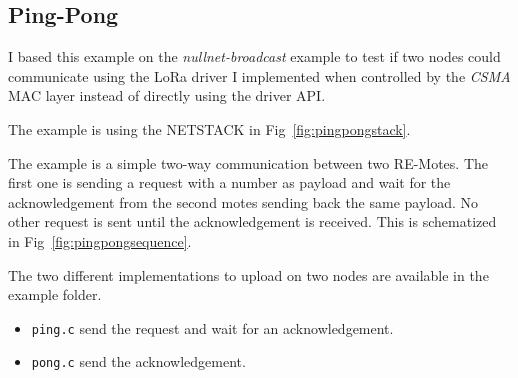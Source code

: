 \subsection{Ping-Pong}

I based this example on the \emph{nullnet-broadcast} example to test if two
nodes could communicate using the LoRa driver I implemented when controlled by
the \emph{CSMA} MAC layer instead of directly using the driver API\@.

The example is using the NETSTACK in Fig~\ref{fig:pingpongstack}.



The example is a simple two-way communication between two RE-Motes. 
The first one is sending a request with a number as
payload and wait for the acknowledgement from the second motes sending back
the same payload. 
No other request is sent until the acknowledgement is received.
This is schematized in Fig~\ref{fig:pingpongsequence}.

The two different implementations to upload on two nodes are available in the
example folder.

\begin{itemize}
  \item \lstinline{ping.c} send the request and wait for an acknowledgement.
  \item \lstinline{pong.c} send the acknowledgement.
\end{itemize}


